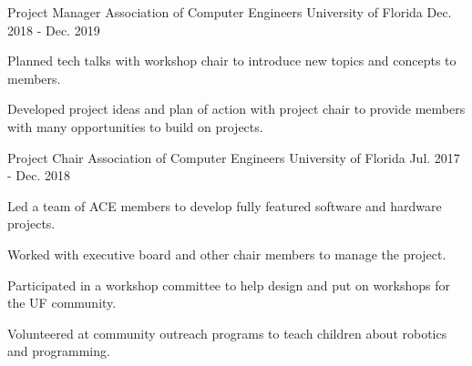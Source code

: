 


\begin{cventries}

\cventry
{Project Manager} %
{Association of Computer Engineers} %
{University of Florida} %
{Dec. 2018 - Dec. 2019} %
{ %
	\begin{cvitems}
		\setlength{\itemindent}{.125in}
		\item {Planned tech talks with workshop chair to introduce new topics and concepts to members.}
		\item {Developed project ideas and plan of action with project chair to provide members with many opportunities to build on projects.}
	\end{cvitems}
}



\cventry
{Project Chair} %
{Association of Computer Engineers} %
{University of Florida} %
{Jul. 2017 - Dec. 2018} %
{ %
\begin{cvitems}
\setlength{\itemindent}{.125in}
\item {Led a team of ACE members to develop fully featured software and hardware projects.}
\item {Worked with executive board and other chair members to manage the project.}
\item {Participated in a workshop committee to help design and put on workshops for the UF community. }
\item {Volunteered at community outreach programs to teach children about robotics and programming.}
\end{cvitems}
}



\end{cventries}
